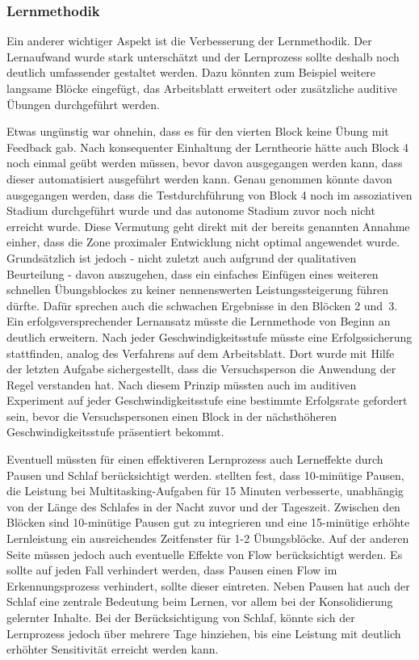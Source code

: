 \documentclass[doc,a4paper,12pt]{apa6}
\begin{document}
\subsubsection{Lernmethodik}

Ein anderer wichtiger Aspekt ist die Verbesserung der Lernmethodik. Der Lernaufwand wurde stark unterschätzt und der Lernprozess sollte deshalb noch deutlich umfassender gestaltet werden. Dazu könnten zum Beispiel weitere langsame Blöcke eingefügt, das Arbeitsblatt erweitert oder zusätzliche auditive Übungen durchgeführt werden.

Etwas ungünstig war ohnehin, dass es für den vierten Block keine Übung mit Feedback gab. Nach konsequenter Einhaltung der Lerntheorie hätte auch Block 4 noch einmal geübt werden müssen, bevor davon ausgegangen werden kann, dass dieser automatisiert ausgeführt werden kann. Genau genommen könnte davon ausgegangen werden, dass die Testdurchführung von Block 4 noch im assoziativen Stadium durchgeführt wurde und das autonome Stadium zuvor noch nicht erreicht wurde. Diese Vermutung geht direkt mit der bereits genannten Annahme einher, dass die Zone proximaler Entwicklung \parencite{kozulin2003vygotsky} nicht optimal angewendet wurde. Grundsätzlich ist jedoch - nicht zuletzt auch aufgrund der qualitativen Beurteilung - davon auszugehen, dass ein einfaches Einfügen eines weiteren schnellen Übungsblockes zu keiner nennenswerten Leistungssteigerung führen dürfte. Dafür sprechen auch die schwachen Ergebnisse in den Blöcken 2 und~3. Ein erfolgsversprechender Lernansatz müsste die Lernmethode von Beginn an deutlich erweitern. Nach jeder Geschwindigkeitsstufe müsste eine Erfolgssicherung stattfinden, analog des Verfahrens auf dem Arbeitsblatt. Dort wurde mit Hilfe der letzten Aufgabe sichergestellt, dass die Versuchsperson die Anwendung der Regel verstanden hat. Nach diesem Prinzip müssten auch im auditiven Experiment auf jeder Geschwindigkeitsstufe eine bestimmte Erfolgsrate gefordert sein, bevor die Versuchspersonen einen Block in der nächsthöheren Geschwindigkeitsstufe präsentiert bekommt.

Eventuell müssten für einen effektiveren Lernprozess auch Lerneffekte durch Pausen und Schlaf berücksichtigt werden. \textcite{sallinen2008recovery} stellten fest, dass 10-minütige Pausen, die Leistung bei Multitasking-Aufgaben für 15 Minuten verbesserte, unabhängig von der Länge des Schlafes in der Nacht zuvor und der Tageszeit. Zwischen den Blöcken sind 10-minütige Pausen gut zu integrieren und eine 15-minütige erhöhte Lernleistung ein ausreichendes Zeitfenster für 1-2 Übungsblöcke. Auf der anderen Seite müssen jedoch auch eventuelle Effekte von Flow \parencite{nakamura2002concept} berücksichtigt werden. Es sollte auf jeden Fall verhindert werden, dass Pausen einen Flow im Erkennungsprozess verhindert, sollte dieser eintreten. Neben Pausen hat auch der Schlaf \parencite{diekelmann2010memory} eine zentrale Bedeutung beim Lernen, vor allem bei der Konsolidierung gelernter Inhalte. Bei der Berücksichtigung von Schlaf, könnte sich der Lernprozess jedoch über mehrere Tage hinziehen, bis eine Leistung mit deutlich erhöhter Sensitivität erreicht werden kann.
\end{document}
